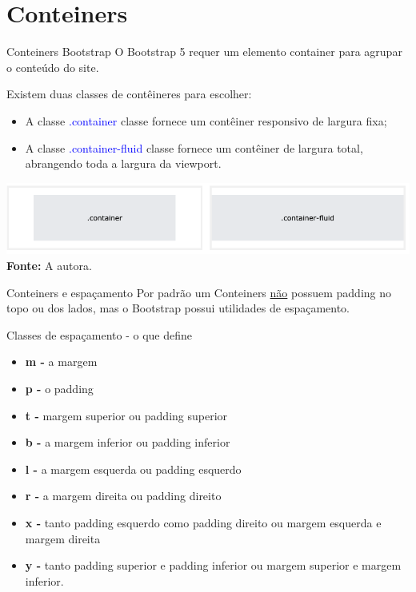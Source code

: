 \documentclass{beamer}
\begin{document}
\section{Conteiners}
\begin{frame}{Conteiners Bootstrap}
O Bootstrap 5 requer um elemento container para agrupar o conteúdo do site.\\

\begin{block}{Existem duas classes de contêineres para escolher:}
    \begin{itemize}
        \item A classe \textcolor{blue}{.container} classe fornece um contêiner responsivo de largura fixa;
        \item A classe \textcolor{blue}{.container-fluid} classe fornece um contêiner de largura total, abrangendo toda a largura da viewport.
    \end{itemize}
\end{block}
    \begin{center}
       \includegraphics[height=0.2\paperheight]{fig/aula6/aula6_2.png} \\
       \tiny{\textbf{Fonte: } A autora.}
      \end{center}

    
\end{frame}
\begin{frame}{Conteiners e espaçamento}
Por padrão um Conteiners \underline{não} possuem padding no topo ou dos lados, mas o Bootstrap possui utilidades de espaçamento.

\begin{block}{Classes de espaçamento -\> o que define}
    \begin{itemize}
        \item \textbf{m -\>} a margem
        \item \textbf{p -\>} o padding
        \item \textbf{t -\>} margem superior ou padding superior
        \item \textbf{b -\>} a margem inferior ou padding inferior
        \item \textbf{l -\>} a margem esquerda ou padding esquerdo
        \item \textbf{r -\>} a margem direita ou padding direito
        \item \textbf{x -\>} tanto padding esquerdo como padding direito ou margem esquerda e margem direita
        \item \textbf{y -\>} tanto padding superior e padding inferior ou margem superior e margem inferior.
    \end{itemize}
\end{block}    
\end{frame}
\end{document}
